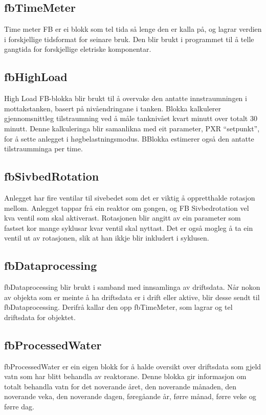 \subsection{fbTimeMeter}
Time meter \gls{FB} er ei blokk som tel tida så lenge den er kalla på, og lagrar verdien i forskjellige tidsformat for seinare bruk.
Den blir brukt i programmet til å telle gangtida for forskjellige eletriske komponentar.

\subsection{fbHighLoad}
High Load \gls{FB}-blokka blir brukt til å overvake den antatte innstraumningen i mottakstanken, basert på nivåendringane i tanken.
Blokka kalkulerer gjennomsnittleg tilstraumning ved å måle tanknivået kvart minutt over totalt 30 minutt.
Denne kalkuleringa blir samanlikna med eit parameter, PXR ``setpunkt'', for å sette anlegget i høgbelastningsmodus.
BBlokka estimerer også den antatte tilstraumminga per time.

\subsection{fbSivbedRotation}
Anlegget har fire ventilar til sivebedet som det er viktig å oppretthalde rotasjon mellom. Anlegget tappar frå ein reaktor om gongen, 
og \gls{FB} Sivbedrotation vel kva ventil som skal aktiverast.
Rotasjonen blir angitt av ein parameter som fastset kor mange syklusar kvar ventil skal nyttast. 
Det er også mogleg å ta ein ventil ut av rotasjonen, slik at han ikkje blir inkludert i syklusen.

\subsection{fbDataprocessing}
fbDataprocessing blir brukt i samband med innsamlinga av driftsdata. 
Når nokon av objekta som er meinte å ha driftsdata er i drift eller aktive, blir desse sendt til fbDataprocessing. Derifrå kallar den opp fbTimeMeter, som lagrar og tel driftsdata for objektet.

\subsection{fbProcessedWater}
fbProcessedWater er ein eigen blokk for å halde oversikt over driftsdata som gjeld vatn som har blitt behandla av reaktorane. 
Denne blokka gir informasjon om totalt behandla vatn for det noverande året, den noverande månaden, 
den noverande veka, den noverande dagen, føregåande år, førre månad, førre veke og førre dag.



